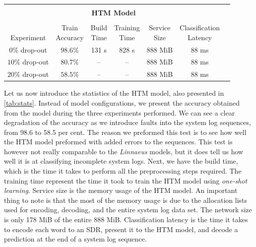 \begin{table}[H]
\begin{tabularx}{\textwidth}{@{} ccccccc}
    &&& &&&\\
    \multicolumn{6}{c}{\centering\parbox{5cm}{\centering\large\textbf{HTM Model}}} \\
    &&& &&&\\
    \multirow{2}{*}{\centering\parbox{2cm}{\centering \\Experiment}}    & \multirow{2}{*}{\centering\parbox{2cm}{\centering Train\\Accuracy}}   &\multirow{2}{*}{\centering\parbox{1.5cm}{\centering Build\\Time}} &\multirow{2}{*}{\centering\parbox{2cm}{\centering Training\\Time}} & \multirow{2}{*}{\centering\parbox{1cm}{\centering Service\\Size}}&\multirow{2}{*}{\centering\parbox{2cm}{\centering Classification\\Latency}}&\\
    &&& &&&\\
    \midrule
    $0\%$ drop-out & $98.6\%$      &131 s      &828 s        &888 MiB     &88 ms&\\
    $10\%$ drop-out& $80.7\%$     &--        &--         &888 MiB     &88 ms&\\
    $20\%$ drop-out& $58.5\%$      &--        &--          &888 MiB     &88 ms&\\
    \bottomrule
\end{tabularx}
\end{table}


Let us now introduce the statistics of the HTM model, also presented in \autoref{tab:stats}. Instead of model configurations, we present the accuracy obtained from the model during the three experiments performed. We can see a clear degradation of the accuracy as we introduce faults into the system log sequences, from 98.6 to 58.5 per cent. The reason we preformed this test is to see how well the HTM model preformed with added errors to the sequences. This test is however not really comparable to the \textit{Linnaeus} models, but it does tell us how well it is at classifying incomplete system logs. Next, we have the build time, which is the time it takes to perform all the preprocessing steps required. The training time represent the time it took to train the HTM model using \textit{one-shot learning}. Service size is the memory usage of the HTM model. An important thing to note is that the most of the memory usage is due to the allocation lists used for encoding, decoding, and the entire system log data set. The network size is only 178 MiB of the entire 888 MiB. Classification latency is the time it takes to encode each word to an SDR, present it to the HTM model, and decode a prediction at the end of a system log sequence. 


